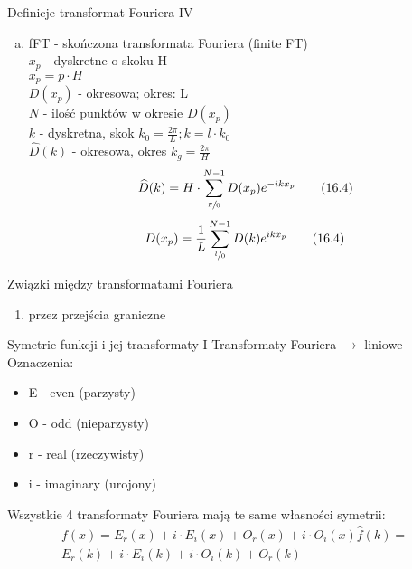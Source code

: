 \begin{frame}{Definicje transformat Fouriera IV}
	\begin{enumerate}[d)]
		\item fFT - skończona transformata Fouriera (finite FT) \\
		$x_p$ - dyskretne o skoku H \\
		$x_p = p \cdot H$ \\
		$D(x_p)$ - okresowa; okres: L \\
		$N$ - ilość punktów w okresie $D(x_p)$ \\
		$k$ - dyskretna, skok $k_0 = \frac{2 \pi}{L}; k = l \cdot k_0$ \\
		$\widehat{D}(k)$ - okresowa, okres $k_g = \frac{2 \pi}{H}$
		\[
			\widehat{D}(k) = H \cdot \sum_{\sfrac{p}{0}}^{N-1} D(x_p) e^{-ikx_p}
			\tag{16.4}
		\]
		\[
			D(x_p) = \frac{1}{L} \sum_{\sfrac{l}{0}}^{N-1} D(k) e^{ikx_p}
			\tag{16.4}
		\]
	\end{enumerate}
\end{frame}
\begin{frame}{Związki między transformatami Fouriera}
	\begin{enumerate}
		\item przez przejścia graniczne
	\end{enumerate}
\end{frame}
\begin{frame}{Symetrie funkcji i jej transformaty I}
	Transformaty Fouriera $\to$ liniowe
	\\ Oznaczenia:
	\begin{itemize}
		\item E - even (parzysty)
		\item O - odd (nieparzysty)
		\item r - real (rzeczywisty)
		\item i - imaginary (urojony)
	\end{itemize}
	Wszystkie 4 transformaty Fouriera mają te same własności symetrii:
	\begin{align*}
		f(x) = E_r(x) + i \cdot E_i(x) + O_r(x) + i \cdot O_i(x) \widehat{f}(k) =
		\tag{16.5} \\
		E_r(k) + i \cdot E_i(k) + i \cdot O_i(k) + O_r(k)
		\tag{16.6}
	\end{align*}
\end{frame}

